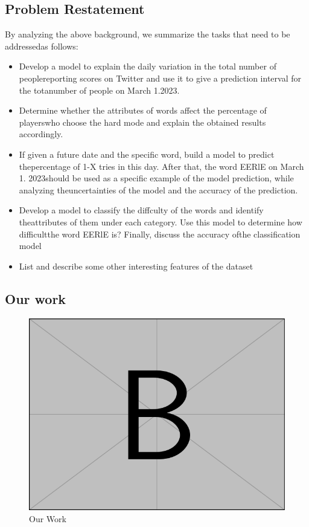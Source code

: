 \documentclass[12pt]{ctexart}
\newcommand{\upcite}[1]{\textsuperscript{\textsuperscript{\cite{#1}}}}%
\begin{document}
\subsection{Problem Restatement} %
By analyzing the above background, we summarize the tasks that need to be addressedas follows:
\begin{itemize}
	\item Develop a model to explain the daily variation in the total number of peoplereporting scores on Twitter and use it to give a prediction interval for the totanumber of people on March 1.2023.
	\item Determine whether the attributes of words affect the percentage of playerswho choose the hard mode and explain the obtained results accordingly.
	\item If given a future date and the specific word, build a model to predict thepercentage of 1-X tries in this day. After that, the word EERlE on March 1. 2023should be used as a specific example of the model prediction, while analyzing theuncertainties of the model and the accuracy of the prediction.
	\item Develop a model to classify the diffculty of the words and identify theattributes of them under each category. Use this model to determine how difficultthe word EERlE is? Finally, discuss the accuracy ofthe classification model
	\item List and describe some other interesting features of the dataset
\end{itemize}



\subsection{Our work}%
\begin{figure}[htbp]
	\centering
	\includegraphics[height=8\baselineskip]{example-image-b.pdf}
	\caption{Our Work}
	\vspace{-20pt}
\end{figure}
\end{document}
